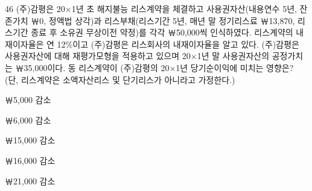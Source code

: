 \begin{question}{46}
(주)감평은 20×1년 초 해지불능 리스계약을 체결하고 사용권자산(내용연수 5년, 잔존가치 ￦0, 정액법 상각)과 리스부채(리스기간 5년, 매년 말 정기리스료 ￦13,870, 리스기간 종료 후 소유권 무상이전 약정)를 각각 ￦50,000씩 인식하였다. 리스계약의 내재이자율은 연 12\%이고 (주)감평은 리스회사의 내재이자율을 알고 있다. (주)감평은 사용권자산에 대해 재평가모형을 적용하고 있으며 20×1년 말 사용권자산의 공정가치는 ￦35,000이다. 동 리스계약이 (주)감평의 20×1년 당기순이익에 미치는 영향은? (단, 리스계약은 소액자산리스 및 단기리스가 아니라고 가정한다.)
\begin{choices}
  \item ￦5,000 감소
  \item ￦6,000 감소
  \item ￦15,000 감소
  \item ￦16,000 감소
  \item ￦21,000 감소
\end{choices}
\end{question}
